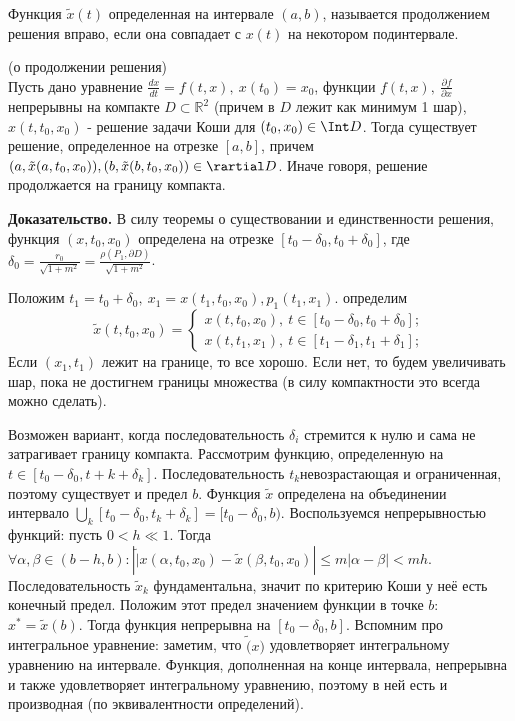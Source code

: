 \begin{defin}
Функция $\tilde x(t)$ определенная на интервале $(a,b)$, называется 
продолжением решения вправо, если она совпадает с $x(t)$ на некотором
подинтервале.
\end{defin}


\begin{theor}
    (о продолжении решения)\\
    Пусть дано уравнение $\frac{dx}{dt}=f(t,x),~x(t_0)=x_0$, 
    функции $f(t,x),~\frac{\partial f}{\partial x}$ непрерывны на компакте
    $D\subset \mathbb{R}^2$ (причем в $D$ лежит как минимум 1 шар),
    $x(t,t_0,x_0)$ - решение задачи Коши для  $(t_0,x_0)\in \Int D$. 
    Тогда существует решение, определенное на отрезке $[a,b]$, причем
     $(a,\tilde x(a,t_0,x_0)),(b,\tilde x(b,t_0,x_0))\in \rartial D$.
     Иначе говоря, решение продолжается на границу компакта.
\end{theor}
\textbf{Доказательство.} В силу теоремы о существовании и единственности 
решения, функция $(x,t_0,x_0)$ определена на отрезке $[t_0-\delta_0,
t_0+\delta_0]$, где $\delta_0=\frac{r_0}{\sqrt{1+m^2} }= \frac{\rho(P_1,
\partial D)}{\sqrt{1+m^2} }$. 

Положим $t_1=t_0+\delta_0,~x_1=x(t_1,t_0,x_0),p_1(t_1,x_1)$. 
определим 
$$\tilde x(t,t_0,x_0)=\begin{cases}
    x(t,t_0,x_0),~t\in [t_0-\delta_0,t_0+\delta_0];\\
    x(t,t_1,x_1),~t\in [t_1-\delta_1,t_1+\delta_1];
\end{cases}$$
Если $(x_1,t_1)$ лежит на границе, то все хорошо. Если нет, то будем 
увеличивать шар, пока не достигнем границы множества (в силу компактности 
это всегда можно сделать). 

Возможен вариант, когда последовательность $\delta_i$ стремится к нулю и 
сама не затрагивает границу компакта. Рассмотрим функцию, определенную 
на $t\in [t_0-\delta_0,t+k+\delta_k]$. Последовательность 
$t_k$невозрастающая и ограниченная, поэтому существует и предел 
$b$. Функция $\tilde x$  определена на объединении интервало
$\bigcup\limits_{k}[t_0-\delta_0,t_k+\delta_k]=[t_0-\delta_0,b)$.
Воспользуемся непрерывностью функций: пусть $0<h\ll1$.
Тогда $\forall \alpha,\beta\in (b-h,b):|\tilde| x(\alpha,t_0,x_0)-
\tilde x(\beta,t_0,x_0)|\leqslant m|\alpha-\beta|<mh$. 
Последовательность $\tilde x_k$ фундаментальна, значит по критерию Коши 
у неё есть конечный предел. Положим этот предел значением функции 
в точке $b$:  $x^*=\tilde x(b)$. Тогда функция непрерывна на $[t_0-\delta_0,
b]$. Вспомним про интегральное уравнение: заметим, что $\tilde(x)$ 
удовлетворяет интегральному уравнению на интервале. Функция, дополненная
на конце интервала, непрерывна и также удовлетворяет интегральному 
уравнению, поэтому в ней есть и производная (по эквивалентности
определений).

